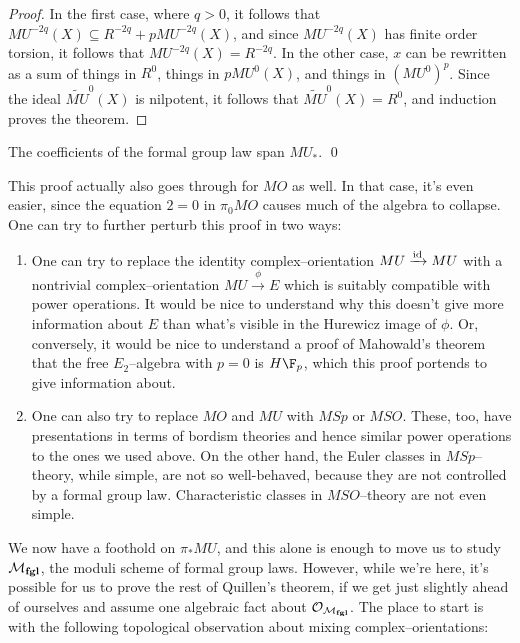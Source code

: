 \begin{proof}
In the first case, where $q > 0$, it follows that $MU^{-2q}(X) \subseteq R^{-2q} + pMU^{-2q}(X)$, and since $MU^{-2q}(X)$ has finite order torsion, it follows that $MU^{-2q}(X) = R^{-2q}$.  In the other case, $x$ can be rewritten as a sum of things in $R^{0}$, things in $p MU^{0}(X)$, and things in $(MU^0)^p$.  Since the ideal $\widetilde{MU}^0(X)$ is nilpotent, it follows that $\widetilde{MU}^0(X) = R^0$, and induction proves the theorem.
\end{proof}

\begin{corollary}\label{QuillenSurjective}
The coefficients of the formal group law span $MU_*$. \qed
\end{corollary}

\begin{remark}
This proof actually also goes through for $MO$ as well.  In that case, it's even easier, since the equation $2 = 0$ in $\pi_0 MO$ causes much of the algebra to collapse.  One can try to further perturb this proof in two ways:
\begin{enumerate}
\item One can try to replace the identity complex--orientation $MU \xrightarrow{\mathrm{id}} MU$ with a nontrivial complex--orientation $MU \xrightarrow{\phi} E$ which is suitably compatible with power operations.  It would be nice to understand why this doesn't give more information about $E$ than what's visible in the Hurewicz image of $\phi$.  Or, conversely, it would be nice to understand a proof of Mahowald's theorem that the free $E_2$--algebra with $p = 0$ is $H\F_p$, which this proof portends to give information about.
\item One can also try to replace $MO$ and $MU$ with $MSp$ or $MSO$.  These, too, have presentations in terms of bordism theories and hence similar power operations to the ones we used above.  On the other hand, the Euler classes in $MSp$--theory, while simple, are not so well-behaved, because they are not controlled by a formal group law.  Characteristic classes in $MSO$--theory are not even simple.
\end{enumerate}
\end{remark}

We now have a foothold on $\pi_* MU$, and this alone is enough to move us to study $\mathcal{M}_{\mathbf{fgl}}$, the moduli scheme of formal group laws.  However, while we're here, it's possible for us to prove the rest of Quillen's theorem, if we get just slightly ahead of ourselves and assume one algebraic fact about $\mathcal{O}_{\mathcal{M}_{\mathbf{fgl}}}$.  The place to start is with the following topological observation about mixing complex--orientations:

